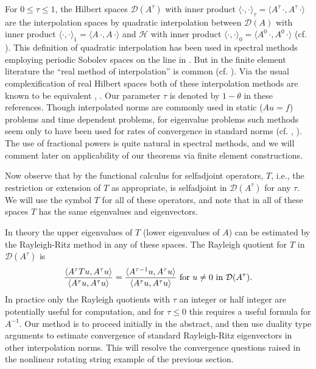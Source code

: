 \documentclass[final]{siamltex}
\numberwithin{equation}{section}
\begin{document}
For $0\le \tau \le 1$, the Hilbert spaces $\mathcal{D}(A^{\tau})$ with inner product $\langle \cdot , \cdot \rangle_{\tau}= \langle A^{\tau} \, \cdot , A^{\tau} \, \cdot \rangle$ are the interpolation spaces by quadratic interpolation between $\mathcal{D}(A)$ with inner product $\langle \cdot , \cdot \rangle_{1}= \langle A \, \cdot , A \, \cdot \rangle$ and $\mathcal{H}$ with inner product
$\langle \cdot , \cdot \rangle_{0}= \langle A^{0} \, \cdot , A^{0} \, \cdot \rangle$ (cf. \cite{AAH}). This definition of quadratic interpolation has been used in spectral methods employing periodic Sobolev spaces on the line in \cite{Mercier}. But in the finite element literature the ``real method of
interpolation'' is common (cf. \cite{Bramble} \cite{Brenner-Scott}). Via the usual complexification of real Hilbert spaces both of these interpolation methods are known to be equivalent \cite{Lions-RPR}, \cite{Lions-Magenes}. Our parameter $\tau$ is denoted by $1-\theta$ in these references. Though interpolated norms are commonly used in static ($A u =f $) problems and time dependent problems, for eigenvalue problems such methods seem only to have been used for rates of convergence in standard norms (cf. \cite{Beattie-Greenlee-Ober}, \cite{Beattie-Greenlee}). The use of fractional powers is quite natural in spectral methods, and we will comment later on applicability of our theorems via finite element constructions.

Now observe that by the functional calculus for selfadjoint operators, $T$, i.e., the restriction or extension of $T$ as appropriate, is selfadjoint in $\mathcal{D}(A^{\tau})$ for any $\tau$. We will use the symbol $T$ for all of these operators, and note that in all of these spaces $T$ has the same eigenvalues and eigenvectors.

In theory the upper eigenvalues of $T$ (lower eigenvalues of $A$) can be estimated by the Rayleigh-Ritz method in any of these spaces. The Rayleigh quotient for $T$ in $\mathcal{D}(A^{\tau})$ is
\begin{equation}\notag
\frac{\langle A^{\tau} T u, A^{\tau} u\rangle}
{\langle A^{\tau} u, A^{\tau}  u \rangle}
=\frac{\langle A^{\tau-1} u, A^{\tau} u\rangle}
{\langle A^{\tau} u, A^{\tau}  u \rangle} \text{ for } u \neq 0 \text{ in } \mathcal{D}(A^{\tau}).
\end{equation}
In practice only the Rayleigh quotients with $\tau$ an integer or half integer are potentially useful for computation, and for $\tau\le 0$ this requires a useful formula for $A^{-1}$. Our method is to proceed initially in the abstract, and then use duality type arguments to estimate convergence of standard Rayleigh-Ritz eigenvectors in other interpolation norms. This will resolve the convergence questions raised in the nonlinear rotating string example of the previous section.
\end{document}
